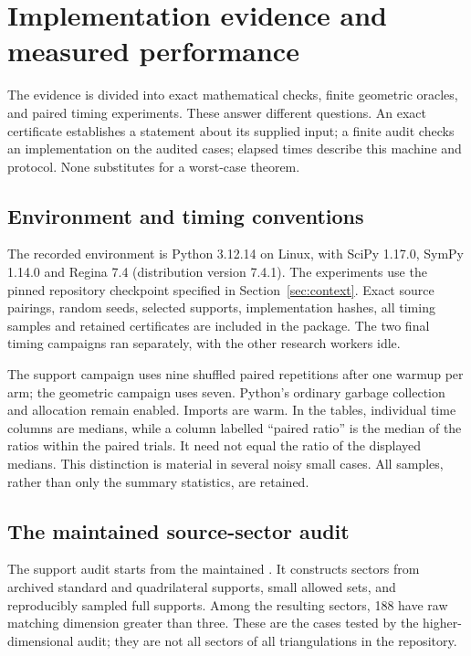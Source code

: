 \section{Implementation evidence and measured performance}
\label{sec:experiments}

The evidence is divided into exact mathematical checks, finite geometric
oracles, and paired timing experiments. These answer different questions.
An exact certificate establishes a statement about its supplied input;
a finite audit checks an implementation on the audited cases; elapsed
times describe this machine and protocol. None substitutes for a
worst-case theorem.

\subsection{Environment and timing conventions}

The recorded environment is Python 3.12.14 on Linux, with SciPy 1.17.0,
SymPy 1.14.0 and Regina 7.4 (distribution version 7.4.1). The experiments
use the pinned repository checkpoint specified in
Section~\ref{sec:context}. Exact source pairings, random seeds, selected
supports, implementation hashes, all timing samples and retained
certificates are included in the package. The two final timing campaigns
ran separately, with the other research workers idle.

The support campaign uses nine shuffled paired repetitions after one
warmup per arm; the geometric campaign uses seven. Python's ordinary
garbage collection and allocation remain enabled. Imports are warm.
In the tables, individual time columns are medians, while a column
labelled ``paired ratio'' is the median of the ratios within the paired
trials. It need not equal the ratio of the displayed medians. This
distinction is material in several noisy small cases. All samples,
rather than only the summary statistics, are retained.

\subsection{The maintained source-sector audit}

The support audit starts from the maintained
. It constructs sectors
from archived standard and quadrilateral supports, small allowed sets,
and reproducibly sampled full supports. Among the resulting sectors,
188 have raw matching dimension greater than three. These are the cases
tested by the higher-dimensional audit; they are not all sectors of
all triangulations in the repository.

